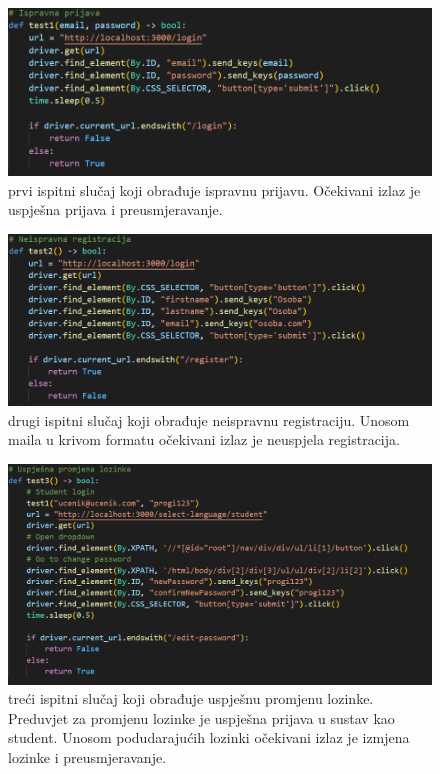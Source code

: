 \begin{figure}[htp]
    \caption{prvi ispitni slučaj koji obrađuje ispravnu prijavu. Očekivani izlaz je uspješna prijava i preusmjeravanje.}
    \includegraphics[scale=0.5]{dijagrami/test1.png}
    \centering
    
\end{figure}
\break

\begin{figure}[htp]
    \caption{drugi ispitni slučaj koji obrađuje neispravnu registraciju. Unosom maila u krivom formatu očekivani izlaz je neuspjela registracija.}
    \includegraphics[scale=0.5]{dijagrami/test2.png}
    \centering
    
\end{figure}
\break

\begin{figure}[htp]
    \caption{treći ispitni slučaj koji obrađuje uspješnu promjenu lozinke. Preduvjet za promjenu lozinke je uspješna prijava u sustav kao student. Unosom podudarajućih lozinki očekivani izlaz je izmjena lozinke i preusmjeravanje.}
    \includegraphics[scale=0.5]{dijagrami/test3.png}
    \centering
    
\end{figure}
\break

